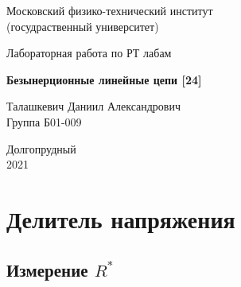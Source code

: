 \documentclass[a4paper, 12pt]{article}%
\begin{document}


\begin{titlepage}

	\newpage
	\begin{center}
		\normalsize Московский физико-технический институт \\(госудраственный 			университет)
	\end{center}

	\vspace{6em}

	\begin{center}
		\Large Лабораторная работа по РТ лабам\\
	\end{center}

	\vspace{1em}

	\begin{center}
		\large \textbf{Безынерционные линейные цепи [24]}
	\end{center}

	\vspace{2em}

	\begin{center}
		\large Талашкевич Даниил Александрович\\
		Группа Б01-009
	\end{center}

	\vspace{\fill}

	\begin{center}
	Долгопрудный \\2021
	\end{center}
	
\end{titlepage}



	\thispagestyle{empty}
	\newpage
	\tableofcontents
	\newpage
	\setcounter{page}{1}


					
\section{Делитель напряжения}

\subsection{Измерение $R^{*}$}
\end{document}
